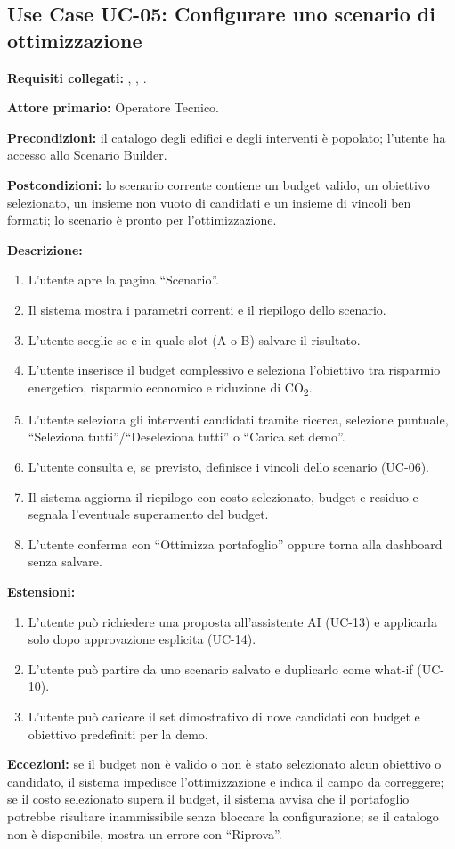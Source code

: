 \subsection*{Use Case UC-05: Configurare uno scenario di ottimizzazione}
\textbf{Requisiti collegati:} , , .\par
\textbf{Attore primario:} Operatore Tecnico.\par
\textbf{Precondizioni:} il catalogo degli edifici e degli interventi è popolato; l'utente ha accesso allo Scenario Builder.\par
\textbf{Postcondizioni:} lo scenario corrente contiene un budget valido, un obiettivo selezionato, un insieme non vuoto di candidati e un insieme di vincoli ben formati; lo scenario è pronto per l'ottimizzazione.\par
\textbf{Descrizione:}
\begin{enumerate}[leftmargin=1.6em, itemsep=0.1em]
    \item L'utente apre la pagina ``Scenario''.
    \item Il sistema mostra i parametri correnti e il riepilogo dello scenario.
    \item L'utente sceglie se e in quale slot (A o B) salvare il risultato.
    \item L'utente inserisce il budget complessivo e seleziona l'obiettivo tra risparmio energetico, risparmio economico e riduzione di CO\textsubscript{2}.
    \item L'utente seleziona gli interventi candidati tramite ricerca, selezione puntuale, ``Seleziona tutti''/``Deseleziona tutti'' o ``Carica set demo''.
    \item L'utente consulta e, se previsto, definisce i vincoli dello scenario (UC-06).
    \item Il sistema aggiorna il riepilogo con costo selezionato, budget e residuo e segnala l'eventuale superamento del budget.
    \item L'utente conferma con ``Ottimizza portafoglio'' oppure torna alla dashboard senza salvare.
\end{enumerate}
\textbf{Estensioni:}
\begin{enumerate}[leftmargin=1.6em, itemsep=0.1em]
    \item L'utente può richiedere una proposta all'assistente AI (UC-13) e applicarla solo dopo approvazione esplicita (UC-14).
    \item L'utente può partire da uno scenario salvato e duplicarlo come what-if (UC-10).
    \item L'utente può caricare il set dimostrativo di nove candidati con budget e obiettivo predefiniti per la demo.
\end{enumerate}
\textbf{Eccezioni:} se il budget non è valido o non è stato selezionato alcun obiettivo o candidato, il sistema impedisce l'ottimizzazione e indica il campo da correggere; se il costo selezionato supera il budget, il sistema avvisa che il portafoglio potrebbe risultare inammissibile senza bloccare la configurazione; se il catalogo non è disponibile, mostra un errore con ``Riprova''.

